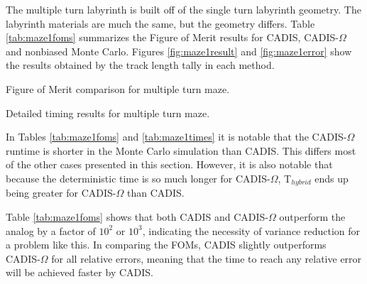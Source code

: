 The multiple turn labyrinth is built off of the single turn labyrinth geometry.
The labyrinth materials are much the same, but the geometry differs. Table
\ref{tab:maze1foms} summarizes the Figure of Merit results for CADIS,
CADIS-$\Omega$ and nonbiased Monte Carlo. Figures \ref{fig:maze1result} and
\ref{fig:maze1error} show the results obtained by the track length tally in each
method.

\begin{table}[h!]
  \centering
  
  \caption[Figure of Merit comparison for multiple turn maze.]{Figure of Merit
    comparison for multiple turn maze.}
  \label{tab:maze1foms}
\end{table}

\begin{table}[h!]
  \centering
  
  \caption[Detailed timing results for multiple turn maze.]
  {Detailed timing results for multiple turn maze.}
  \label{tab:maze1times}
\end{table}

In Tables \ref{tab:maze1foms} and \ref{tab:maze1times}
it is notable that the CADIS-$\Omega$ runtime is
shorter in the Monte Carlo simulation than CADIS. This differs most of the other
cases presented in this section. However, it is also notable that because the
deterministic time is so much longer for CADIS-$\Omega$, T$_{hybrid}$ ends up
being greater for CADIS-$\Omega$ than CADIS.

Table \ref{tab:maze1foms} shows that both CADIS and CADIS-$\Omega$ outperform the
analog by a factor of $10^2$ or $10^3$, indicating the necessity of variance
reduction for a problem like this. In comparing the FOMs, CADIS slightly outperforms
CADIS-$\Omega$ for all relative errors, meaning that the time
to reach any relative error will be achieved faster by CADIS.

